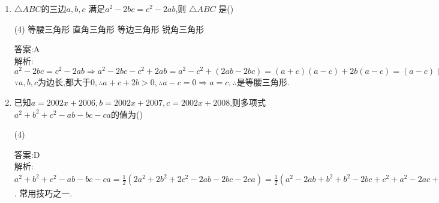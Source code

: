 \documentclass[cn,blue]{elegantbook}
\begin{document}
\begin{enumerate}
\begin{solution}
    答案:D\\
    解析:\(p=-3+5=2,q=-3\times 5=-15\)\\
\end{solution}

    \item  \(\triangle ABC \)的三边\(a,b,c\) 满足\(a^2 - 2bc = c^2 - 2ab\),则 \(\triangle ABC \) 是(\qquad)\\
    \begin{tasks}(4) 
    \task 等腰三角形
    \task 直角三角形
    \task 等边三角形
    \task 锐角三角形
    \end{tasks}

\begin{solution}
    答案:A\\
    解析:\(a^2 - 2bc = c^2 - 2ab \Rightarrow a^2-2bc-c^2+2ab=a^2-c^2+(2ab-2bc)=(a+c)(a-c)+2b(a-c)=(a-c)(a+c+2b)=0.\)\\
    \(\because a,b,c\text{为边长,都大于0},\therefore a+c+2b>0,\therefore a-c=0 \Rightarrow a=c,\therefore \)是等腰三角形.
\end{solution}

    \item 已知\(a = 2002x + 2006,b = 2002x + 2007,c = 2002x + 2008\),则多项式\(a^2 + b^2 + c^2 - ab - bc - ca\)的值为(\qquad)\\
    \begin{tasks}(4) 
    \end{tasks}

\begin{solution}
    答案:D\\
    解析:\(a^2 +b^2+c^2-ab-bc-ca=\frac{1}{2}(2a^2+2b^2+2c^2-2ab-2bc-2ca)=\frac{1}{2}(a^2-2ab+b^2+b^2-2bc+c^2+a^2-2ac+c^2)=\frac{1}{2}[(a-b)^2+(b-c)^2+(a-c)^2]=\frac{1}{2}(1^2+1^2+2^2)=3\). 常用技巧之一.\\
\end{solution}


\end{enumerate}
\end{document}
